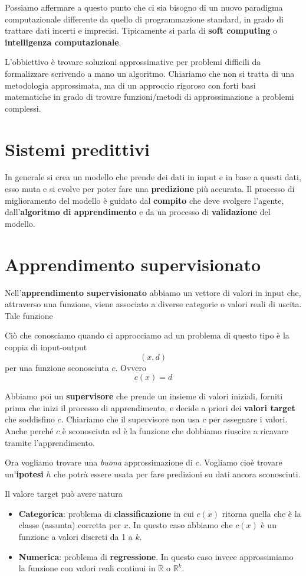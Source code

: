 Possiamo affermare a questo punto che ci sia bisogno di un nuovo paradigma computazionale differente da quello di
programmazione standard, in grado di trattare dati incerti e imprecisi. Tipicamente si parla di \textbf{soft computing} o
\textbf{intelligenza computazionale}.

L'obbiettivo \`e trovare soluzioni approssimative per problemi difficili da formalizzare scrivendo a mano un algoritmo.
Chiariamo che non si tratta di una metodologia approssimata, ma di un approccio rigoroso con forti basi
matematiche in grado di trovare funzioni/metodi di approssimazione a problemi complessi.

\section{Sistemi predittivi}
In generale si crea un modello che prende dei dati in input e in base a questi dati, esso muta e si evolve per poter
fare una \textbf{predizione} pi\`u accurata. Il processo di miglioramento del modello \`e guidato dal \textbf{compito}
che deve svolgere l'agente, dall'\textbf{algoritmo di apprendimento} e da un processo di \textbf{validazione} del modello.

\section{Apprendimento supervisionato}
Nell'\textbf{apprendimento supervisionato} abbiamo un vettore di valori in input che, attraverso
una funzione, viene associato a diverse categorie o valori reali di uscita. Tale funzione

Ci\`o che conosciamo quando ci approcciamo ad un problema di questo tipo \`e la coppia di input-output
\[ (x, d) \]
per una funzione sconosciuta $c$. Ovvero
\[ c(x) = d \]

Abbiamo poi un \textbf{supervisore} che prende un insieme di valori iniziali, forniti prima che inizi il processo di
apprendimento, e decide a priori dei \textbf{valori target} che soddisfino $c$. Chiariamo che il supervisore non usa
$c$ per assegnare i valori. Anche perch\'e $c$ \`e sconosciuta ed \`e la funzione che dobbiamo riuscire a ricavare tramite
l'apprendimento.

Ora vogliamo trovare una \emph{buona} approssimazione di $c$. Vogliamo cio\`e trovare un'\textbf{ipotesi} $h$ che
potr\`a essere usata per fare predizioni su dati ancora sconosciuti.

Il valore target pu\`o avere natura
\begin{itemize}
	\item \textbf{Categorica}: problema di \textbf{classificazione} in cui $c(x)$ ritorna quella che \`e la classe
	      (assunta) corretta per $x$. In questo caso abbiamo che $c(x)$ \`e un funzione a valori discreti da 1 a $k$.
	\item \textbf{Numerica}: problema di \textbf{regressione}. In questo caso invece approssimiamo la funzione con
	      valori reali continui in $\mathbb{R}$ o $\mathbb{R}^k$.
\end{itemize}


